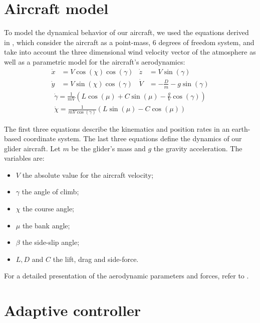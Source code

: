 \documentclass{ifacconf}
\begin{document}
\section{Aircraft model}
\label{sec:aircraft}

To model the dynamical behavior of our aircraft, we used the equations derived in \cite{dynamic}, which consider the aircraft as a point-mass, 6 degrees of freedom system, and take into account the three dimensional wind velocity vector of the atmosphere as well as a parametric model for the aircraft's aerodynamics:
\begin{align*}
\dot{x} &= V \cos(\chi)\cos(\gamma) & \dot{z} &= V \sin(\gamma)\\
\dot{y} &= V \sin(\chi)\cos(\gamma) & \dot{V} &= -\frac{D}{m}-g \sin(\gamma)
\end{align*}
\begin{gather*}
\dot{\gamma}  = \frac{1}{mV}\left(L\cos(\mu) + C \sin(\mu) - \frac{g}{V}\cos(\gamma)\right) \\
\dot{\chi} = \frac{1}{mV \cos(\gamma)}\left(L\sin\left(\mu\right)-C \cos\left(\mu\right)\right)
\end{gather*}


The first three equations describe the kinematics and position rates in an earth-based coordinate system. The last three equations define the dynamics of our glider aircraft. Let $m$ be the glider's mass and $g$ the gravity acceleration. The variables are:
\begin{itemize}
\item $V$ the absolute value for the aircraft velocity;
\item $\gamma$ the angle of climb;
\item $\chi$ the course angle;
\item $\mu$ the bank angle;
\item $\beta$ the side-slip angle;
\item $L, D $ and $C$ the lift, drag and side-force.
\end{itemize}

For a detailed presentation of the aerodynamic parameters and forces, refer to \cite{dynamic}.

\section{Adaptive controller}
\label{sec:control}
\end{document}
